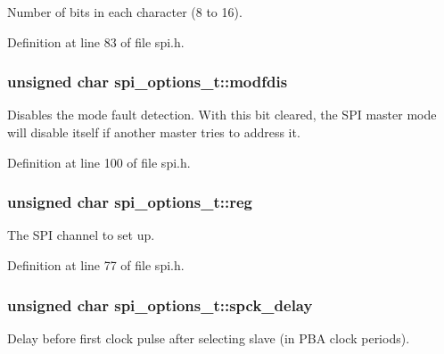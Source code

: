 Number of bits in each character (8 to 16). 



Definition at line 83 of file spi.\+h.

\hypertarget{structspi__options__t_a25aaa6f8b4d65ae291edeb9e4c1c3b57}{}
\subsubsection[{modfdis}]{\setlength{\rightskip}{0pt plus 5cm}unsigned char spi\+\_\+options\+\_\+t\+::modfdis}\label{structspi__options__t_a25aaa6f8b4d65ae291edeb9e4c1c3b57}
Disables the mode fault detection. With this bit cleared, the S\+P\+I master mode will disable itself if another master tries to address it. 

Definition at line 100 of file spi.\+h.

\hypertarget{structspi__options__t_a1e6dfa9b370d7e4f0b4e8d6cb75835a5}{}
\subsubsection[{reg}]{\setlength{\rightskip}{0pt plus 5cm}unsigned char spi\+\_\+options\+\_\+t\+::reg}\label{structspi__options__t_a1e6dfa9b370d7e4f0b4e8d6cb75835a5}


The S\+P\+I channel to set up. 



Definition at line 77 of file spi.\+h.

\hypertarget{structspi__options__t_aa9434f07d440208f42f817cb977f6a52}{}
\subsubsection[{spck\+\_\+delay}]{\setlength{\rightskip}{0pt plus 5cm}unsigned char spi\+\_\+options\+\_\+t\+::spck\+\_\+delay}\label{structspi__options__t_aa9434f07d440208f42f817cb977f6a52}


Delay before first clock pulse after selecting slave (in P\+B\+A clock periods). 



